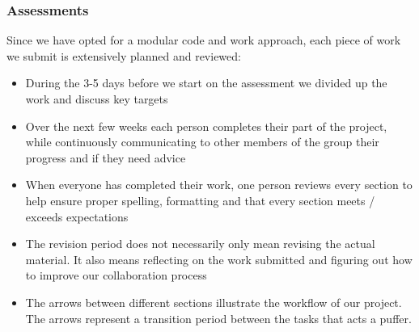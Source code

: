 \documentclass[coverpage,lineno]{../custom}
\begin{document}
\subsubsection{Assessments}
Since we have opted for a modular code and work approach, each piece of work we submit is extensively planned and reviewed:
\begin{itemize}
    \item During the 3-5 days before we start on the assessment we divided up the work and discuss key targets
    \item Over the next few weeks each person completes their part of the project, while continuously communicating to other members of the group their progress and if they need advice
    \item When everyone has completed their work, one person reviews every section to help ensure proper spelling, formatting and that every section meets / exceeds expectations
    \item The revision period does not necessarily only mean revising the actual material. It also means reflecting on the work submitted and figuring out how to improve our collaboration process
    \item The arrows between different sections illustrate the workflow of our project. The arrows represent a transition period between the tasks that acts a puffer.
\end{itemize}
\end{document}

